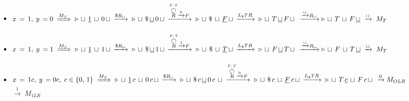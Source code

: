 \begin{itemize}
	\itemsep0em
	\item $x\,=\,1,\; y\,=0 \;\xRightarrow{M_S}\;
	\triangleright\, \sqcup\, \underline{1}\, \sqcup\, 0\, \sqcup\,\xrightarrow{\$R_\sqcup}\;
	\triangleright\, \sqcup\, \$\, \underline{\sqcup}\, 0\, \sqcup\,
	\xrightarrow{\overset{F,\,T}{\overset{\botcircleleft}{R}}\xrightarrow{0}F}\;
	\triangleright\, \sqcup\, \$\, \sqcup\, \underline{F}\, \sqcup\, \xrightarrow{L_\$TR}\;
	\triangleright\, \sqcup\, T\, \underline{\sqcup}\, F\, \sqcup\, \;\xrightarrow{\xrightarrow{\sqcup}R_\sqcup}
	\triangleright\, \sqcup\, T\, \sqcup\, F\, \underline{\sqcup} \;\xrightarrow{\sqcup}\; M_T
	\quad$\textcolor{green}{}

	\item $x\,=\,1,\; y\,=1 \;\xRightarrow{M_S}\;
	\triangleright\, \sqcup\, \underline{1}\, \sqcup\, 1\, \sqcup\,\xrightarrow{\$R_\sqcup}\;
	\triangleright\, \sqcup\, \$\, \underline{\sqcup}\, 1\, \sqcup\,
	\xrightarrow{\overset{F,\,T}{\overset{\botcircleleft}{R}}\xrightarrow{1}F}\;
	\triangleright\, \sqcup\, \$\, \sqcup\, \underline{T}\, \sqcup\, \xrightarrow{L_\$TR}\;
	\triangleright\, \sqcup\, F\, \underline{\sqcup}\, T\, \sqcup\, \;\xrightarrow{\xrightarrow{\sqcup}R_\sqcup}
	\triangleright\, \sqcup\, F\, \sqcup\, T\, \underline{\sqcup} \;\xrightarrow{\sqcup}\; M_T
	\quad$\textcolor{green}{}

	\item $x\,=\,1c,\; y\,=0c,\; c\in\{0,\,1\} \;\xRightarrow{M_S}\;
	\triangleright\, \sqcup\, \underline{1}\, c\, \sqcup\, 0\, c\, \sqcup\,\xrightarrow{\$R_\sqcup}\;
	\triangleright\, \sqcup\, \$\, c\, \underline{\sqcup}\, 0\, c\, \sqcup\\
	\xrightarrow{\overset{F,\,T}{\overset{\botcircleleft}{R}}\xrightarrow{0}F}\;
	\triangleright\, \sqcup\, \$\, c\, \sqcup\, \underline{F}\, c\, \sqcup\, \xrightarrow{L_\$TR}\;
	\triangleright\, \sqcup\, T\, \underline{c}\, \sqcup\, F\, c\, \sqcup\,
	\;\xrightarrow{0} M_{OLR}
	\quad$\textcolor{green}{}
	\makebox[11.3cm]{\hfill} $\xrightarrow{1}\; M_{1LR}\quad\,$ \textcolor{green}{}
\end{itemize}
\clearpage

